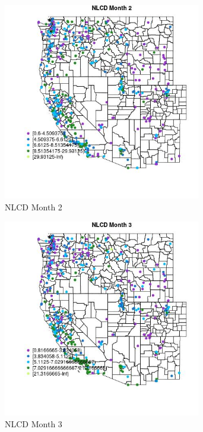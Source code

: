 \clearpage 

\begin{figure} 
\centering  
\includegraphics[width=0.77\textwidth]{Code_Outputs/ML_input_report_ML_input_PM25_Step5_part_d_de_duplicated_aves_ML_input_MapObsMo2NLCD.jpg} 
\caption{\label{fig:ML_input_report_ML_input_PM25_Step5_part_d_de_duplicated_aves_ML_inputMapObsMo2NLCD}NLCD Month 2} 
\end{figure} 
 

\begin{figure} 
\centering  
\includegraphics[width=0.77\textwidth]{Code_Outputs/ML_input_report_ML_input_PM25_Step5_part_d_de_duplicated_aves_ML_input_MapObsMo3NLCD.jpg} 
\caption{\label{fig:ML_input_report_ML_input_PM25_Step5_part_d_de_duplicated_aves_ML_inputMapObsMo3NLCD}NLCD Month 3} 
\end{figure} 
 

